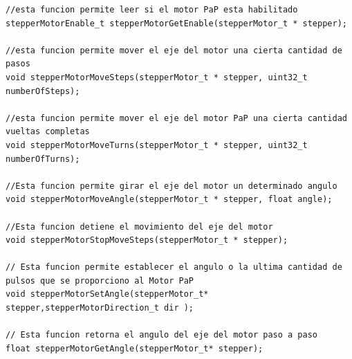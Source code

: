 \begin{lstlisting}[label=cod:vControl,caption=Porción de código del archivo de cabecera con la interfaz pública de la clase StepperMotor.]
//esta funcion permite leer si el motor PaP esta habilitado
stepperMotorEnable_t stepperMotorGetEnable(stepperMotor_t * stepper);

//esta funcion permite mover el eje del motor una cierta cantidad de pasos
void stepperMotorMoveSteps(stepperMotor_t * stepper, uint32_t numberOfSteps);

//esta funcion permite mover el eje del motor PaP una cierta cantidad vueltas completas
void stepperMotorMoveTurns(stepperMotor_t * stepper, uint32_t numberOfTurns);

//Esta funcion permite girar el eje del motor un determinado angulo
void stepperMotorMoveAngle(stepperMotor_t * stepper, float angle);

//Esta funcion detiene el movimiento del eje del motor
void stepperMotorStopMoveSteps(stepperMotor_t * stepper);

// Esta funcion permite establecer el angulo o la ultima cantidad de pulsos que se proporciono al Motor PaP
void stepperMotorSetAngle(stepperMotor_t* stepper,stepperMotorDirection_t dir );

// Esta funcion retorna el angulo del eje del motor paso a paso
float stepperMotorGetAngle(stepperMotor_t* stepper);

		

\end{lstlisting}

